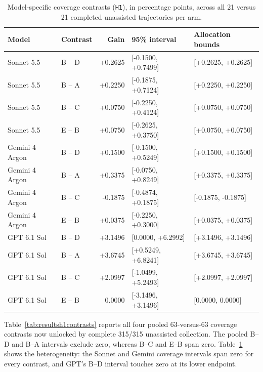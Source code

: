 \begin{table}[!htbp]
\centering\small
\caption{Model-specific coverage contrasts (\texttt{H1}), in percentage
points, across all 21 versus 21 completed unassisted trajectories per arm.}\label{tab:resultsh1modelintervals}

\begin{tabular*}{\textwidth}{@{\extracolsep{\fill}}llrll@{}}
\toprule
Model & Contrast & Gain & 95\% interval & Allocation bounds \\
\midrule
Sonnet 5.5 & B -- D & +0.2625 & [-0.1500, +0.7499] & [+0.2625, +0.2625] \\
Sonnet 5.5 & B -- A & +0.2250 & [-0.1875, +0.7124] & [+0.2250, +0.2250] \\
Sonnet 5.5 & B -- C & +0.0750 & [-0.2250, +0.4124] & [+0.0750, +0.0750] \\
Sonnet 5.5 & E -- B & +0.0750 & [-0.2625, +0.3750] & [+0.0750, +0.0750] \\
\midrule
Gemini 4 Argon & B -- D & +0.1500 & [-0.1500, +0.5249] & [+0.1500, +0.1500] \\
Gemini 4 Argon & B -- A & +0.3375 & [-0.0750, +0.8249] & [+0.3375, +0.3375] \\
Gemini 4 Argon & B -- C & -0.1875 & [-0.4874, +0.1875] & [-0.1875, -0.1875] \\
Gemini 4 Argon & E -- B & +0.0375 & [-0.2250, +0.3000] & [+0.0375, +0.0375] \\
\midrule
GPT 6.1 Sol & B -- D & +3.1496 & [0.0000, +6.2992] & [+3.1496, +3.1496] \\
GPT 6.1 Sol & B -- A & +3.6745 & [+0.5249, +6.8241] & [+3.6745, +3.6745] \\
GPT 6.1 Sol & B -- C & +2.0997 & [-1.0499, +5.2493] & [+2.0997, +2.0997] \\
GPT 6.1 Sol & E -- B & 0.0000 & [-3.1496, +3.1496] & [0.0000, 0.0000] \\
\bottomrule
\end{tabular*}
\end{table}

Table~\ref{tab:resultsh1contrasts} reports all four pooled 63-versus-63
coverage contrasts now unlocked by complete 315/315 unassisted collection.
The pooled B--D and B--A intervals exclude zero, whereas B--C and E--B
span zero. Table~\ref{tab:resultsh1modelintervals} shows the heterogeneity:
the Sonnet and Gemini coverage intervals span zero for every contrast, and
GPT's B--D interval touches zero at its lower endpoint.

